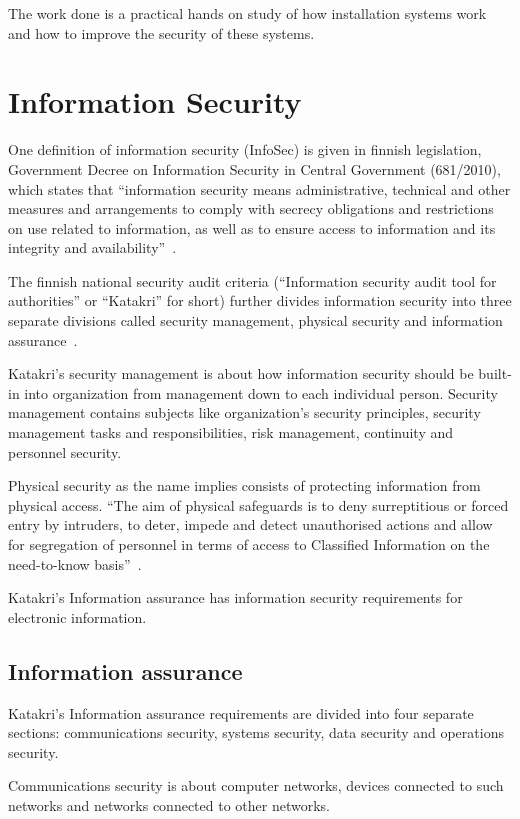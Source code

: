The work done is a practical hands on study of how installation
systems work and how to improve the security of these systems.


\section{Information Security}

One definition of information security (InfoSec) is given in finnish
legislation, Government Decree on Information Security in Central
Government (681/2010), which states that ``information security means
administrative, technical and other measures and arrangements to
comply with secrecy obligations and restrictions on use related to
information, as well as to ensure access to information and its
integrity and availability''~\cite{finlex-infosec-in-gov}.

The finnish national security audit criteria (``Information security
audit tool for authorities'' or ``Katakri'' for short) further divides
information security into three separate divisions called security
management, physical security and information
assurance~\cite{katakri}.

Katakri's security management is about how information security should
be built-in into organization from management down to each individual
person. Security management contains subjects like organization's
security principles, security management tasks and responsibilities,
risk management, continuity and personnel security.

Physical security as the name implies consists of protecting
information from physical access. ``The aim of physical safeguards is
to deny surreptitious or forced entry by intruders, to deter, impede
and detect unauthorised actions and allow for segregation of personnel
in terms of access to Classified Information on the need-to-know
basis''~\cite{katakri}.

Katakri's Information assurance has information security requirements
for electronic information.


\subsection{Information assurance}

Katakri's Information assurance requirements are divided into four
separate sections: communications security, systems security, data
security and operations security.

Communications security is about computer networks, devices connected
to such networks and networks connected to other networks.

